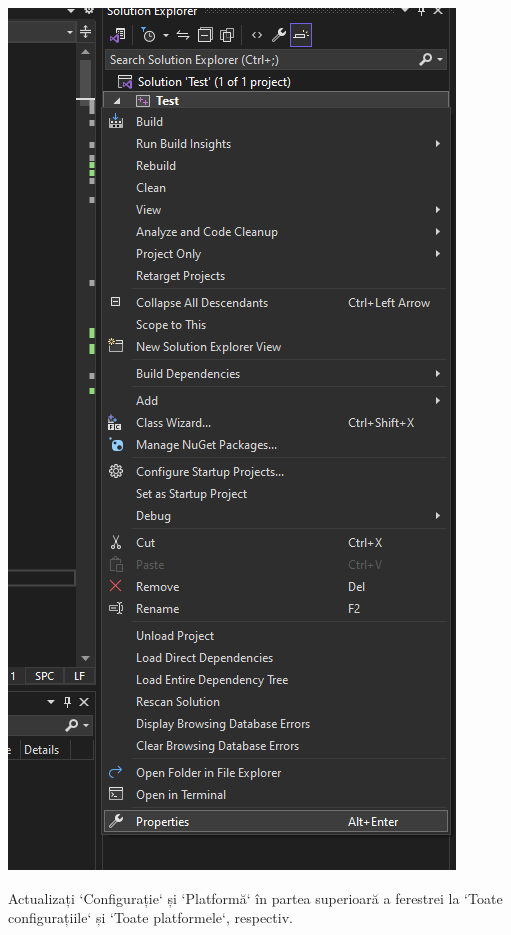 \documentclass[../ro-fa-lab.tex]{subfiles}
\begin{document}
\includegraphics[width=\textwidth,alt={A screenshot of a computer program Description automatically generated}]{./Resources/tutorial_lab9/image9.png}

Actualizați `Configurație` și `Platformă` în partea superioară a ferestrei la `Toate configurațiile` și `Toate platformele`, respectiv.
\end{document}
